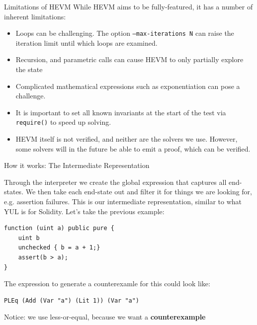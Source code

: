 \documentclass{beamer}
\begin{document}
\begin{frame}[fragile=singleslide]{Limitations of HEVM}
While HEVM aims to be fully-featured, it has a number of inherent limitations:

\begin{itemize}
\item Loops can be challenging. The option \texttt{--max-iterations N} can raise the iteration limit until which loops are examined.
\item Recursion, and parametric calls can cause HEVM to only partially explore the state
\item Complicated mathematical expressions such as exponentiation can pose a challenge.
\item It is important to set all known invariants at the start of the test via \texttt{require()} to speed up solving.
\item HEVM itself is not verified, and neither are the solvers we use. However, some solvers will in the future be able to emit a proof, which can be verified.
\end{itemize}
\end{frame}

\begin{frame}[fragile=singleslide]{How it works: The Intermediate Representation}
\small

Through the interpreter we create the global expression that captures all end-states. We then take each end-state out and filter it for things we are looking for, e.g. assertion failures. This is our intermediate representation, similar to what YUL is for Solidity. Let's take the previous example:


\begin{Verbatim}[frame=single, framerule=0.2mm,framesep=2mm,fontsize=\small]
function (uint a) public pure {
	uint b
	unchecked { b = a + 1;}
	assert(b > a);
}
\end{Verbatim}

The expression to generate a counterexamle for this could look like:

\begin{Verbatim}[frame=single, framerule=0.2mm, framesep=2mm,fontsize=\small]
PLEq (Add (Var "a") (Lit 1)) (Var "a")
\end{Verbatim}

Notice: we use less-or-equal, because we want a \textbf{counterexample}
\end{frame}
\end{document}
